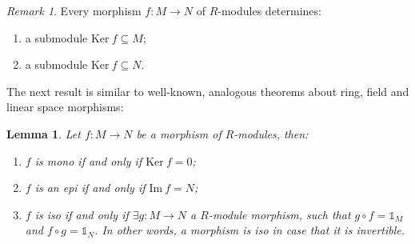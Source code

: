 \documentclass[12pt, a4paper, titlepage]{report}
\theoremstyle{plain} %
\newtheorem{lem}[thm]{Lemma}
\theoremstyle{definition}
\theoremstyle{remark}
\newtheorem*{rem}{Remark}
\begin{document}
\begin{rem}
  Every morphism $f : M \rightarrow N$ of $R$-modules determines:

  \begin{enumerate}
  \item a submodule $\mathrm{Ker} \ f \subseteq M$;
  \item a submodule $\mathrm{Ker} \ f \subseteq N$.
  \end{enumerate}
\end{rem}

The next result is similar to well-known, analogous theorems about ring, field and linear space morphisms:

\begin{lem}
  Let $f : M \rightarrow N$ be a morphism of $R$-modules, then:

  \begin{enumerate}
  \item $f$ is mono if and only if $\mathrm{Ker} \ f = 0$;
  \item $f$ is an epi if and only if $\mathrm{Im} \ f = N$;
  \item $f$ is iso if and only if $\exists g : M \rightarrow N$ a $R$-module morphism,
    such that $g \circ f = \mathds{1}_M$ and $f \circ g = \mathds{1}_N$. In other words,
    a morphism is iso in case that it is invertible.
  \end{enumerate}
\end{lem}
\end{document}
